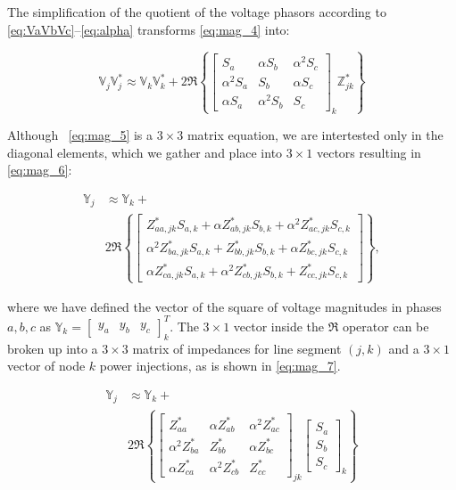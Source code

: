 The simplification of the quotient of the voltage phasors according to \eqref{eq:VaVbVc}--\eqref{eq:alpha} transforms \eqref{eq:mag_4} into:
	
\begin{equation}
	\mathbb{V}_{j} \mathbb{V}_{j}^{*} \approx \mathbb{V}_{k} \mathbb{V}_{k}^{*} + 2 \Re \left\{
    \begin{bmatrix}
    	S_{a} & \alpha S_{b} & \alpha^{2} S_{c} \\
    	\alpha^{2} S_{a} & S_{b} & \alpha S_{c} \\
    	\alpha S_{a} & \alpha^{2} S_{b} & S_{c}
    \end{bmatrix}_k
    \mathbb{Z}_{jk}^* \right\}
    \label{eq:mag_5}
\end{equation}

Although ~\eqref{eq:mag_5} is a $3\times 3$ matrix equation, we are intertested only in the diagonal elements, which we gather and place into $3 \times 1$ vectors resulting in \eqref{eq:mag_6}:

\begin{align}
	\mathbb{Y}_{j} &\approx \mathbb{Y}_{k} +\nonumber \\
    & 2 \Re \left\{
    \begin{bmatrix}
    	Z_{aa,jk}^{*} S_{a,k}  + \alpha Z_{ab,jk}^{*} S_{b,k}  + \alpha^{2} Z_{ac,jk}^{*} S_{c,k} \\
    	\alpha^{2} Z_{ba,jk}^{*} S_{a,k} + Z_{bb,jk}^{*} S_{b,k} + \alpha Z_{bc,jk}^{*} S_{c,k} \\
    	\alpha Z_{ca,jk}^{*} S_{a,k} + \alpha^{2} Z_{cb,jk}^{*} S_{b,k} + Z_{cc,jk}^{*} S_{c,k}
    \end{bmatrix}
	\right\}
    \label{eq:mag_6},
\end{align}

\noindent  where we have defined the vector of the square of voltage magnitudes in phases $a,b,c$ as $\mathbb{Y}_{k} = \begin{bmatrix} y_{a} & y_{b} & y_{c} \end{bmatrix}_{k}^{T}$.  The $3 \times 1$ vector inside the $\Re$ operator can be broken up into a $3 \times 3$ matrix of impedances for line segment $(j,k)$ and a $3 \times 1$ vector of node $k$ power injections, as is shown in \eqref{eq:mag_7}.

\begin{align}
	\mathbb{Y}_{j} &\approx \mathbb{Y}_{k} + \nonumber \\
    &2 \Re \left\{
    \begin{bmatrix}
    	Z_{aa}^{*} & \alpha Z_{ab}^{*} & \alpha^{2} Z_{ac}^{*} \\
    	\alpha^{2} Z_{ba}^{*} & Z_{bb}^{*} & \alpha Z_{bc}^{*} \\
    	\alpha Z_{ca}^{*} & \alpha^{2} Z_{cb}^{*} & Z_{cc}^{*}
    \end{bmatrix}_{jk}
    \begin{bmatrix}
    	S_{a} \\ S_{b} \\ S_{c}
    \end{bmatrix}_{k}
	\right\}
    \label{eq:mag_7}
\end{align}

